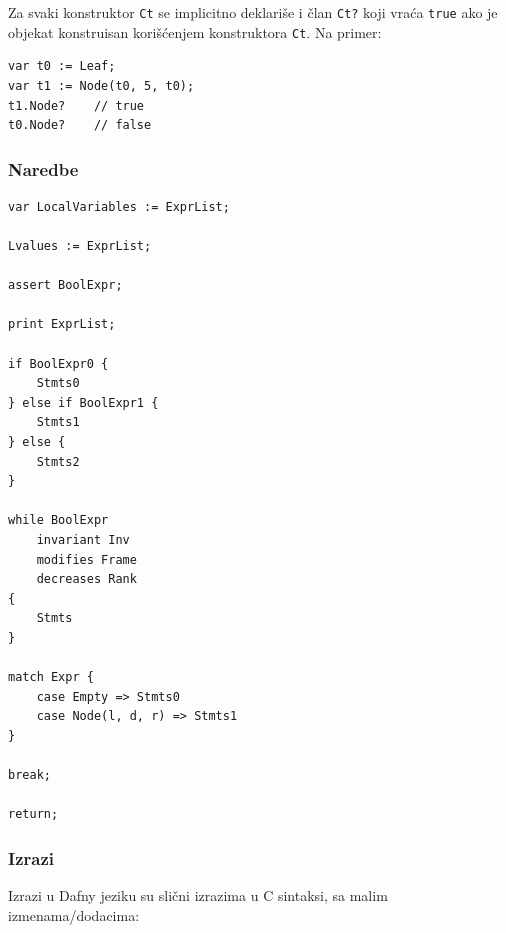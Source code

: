 Za svaki konstruktor \texttt{Ct} se implicitno deklariše i član \texttt{Ct?} koji vraća \texttt{true} ako je objekat konstruisan korišćenjem konstruktora \texttt{Ct}. Na primer:

\begin{verbatim}
var t0 := Leaf;
var t1 := Node(t0, 5, t0);
t1.Node?    // true
t0.Node?    // false
\end{verbatim}

\subsubsection{Naredbe}\label{naredbe}

\begin{verbatim}
var LocalVariables := ExprList;

Lvalues := ExprList;

assert BoolExpr;

print ExprList;

if BoolExpr0 {
    Stmts0
} else if BoolExpr1 {
    Stmts1
} else {
    Stmts2
}

while BoolExpr
    invariant Inv
    modifies Frame
    decreases Rank
{
    Stmts
}

match Expr {
    case Empty => Stmts0
    case Node(l, d, r) => Stmts1
}

break;

return;
\end{verbatim}

\subsubsection{Izrazi}\label{izrazi}

Izrazi u Dafny jeziku su slični izrazima u C sintaksi, sa malim izmenama/dodacima:

